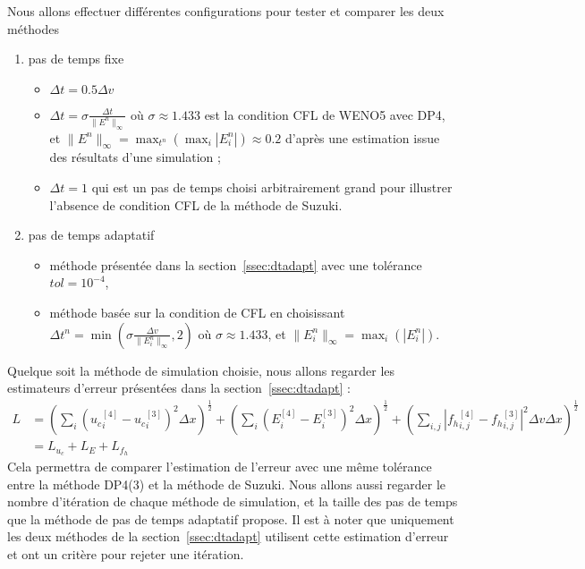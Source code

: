 Nous allons effectuer différentes configurations pour tester et comparer les deux méthodes 
\begin{enumerate}
  \item pas de temps fixe 
    \begin{itemize}
      \item  $\Delta t = 0.5\Delta v$ 
      \item  $\Delta t = \sigma\frac{\Delta t}{\|E^n\|_\infty}$ où $\sigma \approx 1.433$ est la condition CFL de WENO5 avec DP4, et $\|E^n\|_\infty = \max_{t^n}(\max_i|E_i^n|) \approx 0.2$ d'après une estimation issue des résultats d'une simulation ; 
      \item  $\Delta t = 1$ qui est un pas de temps choisi arbitrairement grand pour illustrer l'absence de condition CFL de la méthode de Suzuki. 
    \end{itemize}
  \item pas de temps adaptatif
    \begin{itemize}
      \item méthode présentée dans la section~\ref{ssec:dtadapt} avec une tolérance $tol = 10^{-4}$, 
      \item méthode basée sur la condition de CFL en choisissant $\Delta t^n = \min\left(\sigma\frac{\Delta v}{\|E^n_i\|_\infty},2\right)$ où $\sigma \approx 1.433$, et $\|E_i^n\|_\infty = \max_i\left( |E^n_i|\right)$.
    \end{itemize}
\end{enumerate}
Quelque soit la méthode de simulation choisie, nous allons regarder les estimateurs d'erreur présentées dans la section~\ref{ssec:dtadapt} :
$$
  \begin{aligned}
    L &= \left(\sum_i (\left.u_c\right.^{[4]}_i-\left.u_c\right.^{[3]}_i)^2\Delta x\right)^{\frac{1}{2}}
          + \left(\sum_i (\left.E\right.^{[4]}_i-\left.E\right.^{[3]}_i)^2\Delta x\right)^{\frac{1}{2}}
          + \left(\sum_{i,j} \left|\left.{f}_h\right.^{[4]}_{i,j}-\left.{f}_h\right.^{[3]}_{i,j}\right|^2\Delta v\Delta x\right)^{\frac{1}{2}} \\
      &= L_{u_c} + L_{E} + L_{{f}_h}
  \end{aligned}
$$
Cela permettra de comparer l'estimation de l'erreur avec une même tolérance entre la méthode DP4(3) et la méthode de Suzuki. Nous allons aussi regarder le nombre d'itération de chaque méthode de simulation, et la taille des pas de temps que la méthode de pas de temps adaptatif propose. Il est à noter que uniquement les deux méthodes de la section~\ref{ssec:dtadapt} utilisent cette estimation d'erreur et ont un critère pour rejeter une itération.

